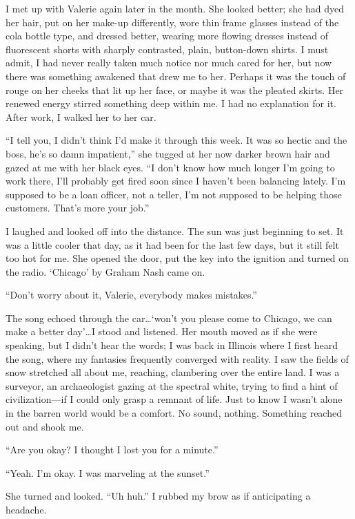 I met up with Valerie again later in the month. She looked better; she
had dyed her hair, put on her make-up differently, wore thin frame
glasses instead of the cola bottle type, and dressed better, wearing
more flowing dresses instead of fluorescent shorts with sharply
contrasted, plain, button-down shirts. I must admit, I had never really
taken much notice nor much cared for her, but now there was something
awakened that drew me to her. Perhaps it was the touch of rouge on her
cheeks that lit up her face, or maybe it was the pleated skirts. Her
renewed energy stirred something deep within me. I had no explanation
for it. After work, I walked her to her car.

``I tell you, I didn't think I'd make it through this week. It was so
hectic and the boss, he's so damn impatient,'' she tugged at her now
darker brown hair and gazed at me with her black eyes. ``I don't know
how much longer I'm going to work there, I'll probably get fired soon
since I haven't been balancing lately. I'm supposed to be a loan
officer, not a teller, I'm not supposed to be helping those customers.
That's more your job.''

I laughed and looked off into the distance. The sun was just beginning
to set. It was a little cooler that day, as it had been for the last few
days, but it still felt too hot for me. She opened the door, put the key
into the ignition and turned on the radio. `Chicago' by Graham Nash came
on.

``Don't worry about it, Valerie, everybody makes mistakes.''

The song echoed through the car\ldots{}`won't you please come to
Chicago, we can make a better day'\ldots I stood and listened. Her mouth
moved as if she were speaking, but I didn't hear the words; I was back
in Illinois where I first heard the song, where my fantasies frequently
converged with reality. I saw the fields of snow stretched all about me,
reaching, clambering over the entire land. I was a surveyor, an
archaeologist gazing at the spectral white, trying to find a hint of
civilization---if I could only grasp a remnant of life. Just to know I
wasn't alone in the barren world would be a comfort. No sound, nothing.
Something reached out and shook me.

``Are you okay? I thought I lost you for a minute.''

``Yeah. I'm okay. I was marveling at the sunset.''

She turned and looked. ``Uh huh.'' I rubbed my brow as if anticipating a
headache.

